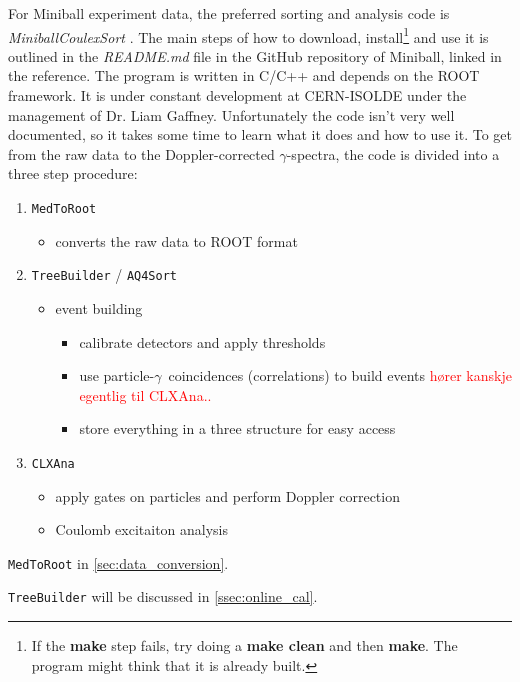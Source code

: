 \documentclass[twoside,english]{uiofysmaster/uiofysmaster}
\newcommand{\ga}{$\gamma$}
\let\orgautoref\autoref
\renewcommand{\autoref}
        {%
		 \def\sectionautorefname{Section}%
		 \def\subsectionautorefname{Section}%
		 \def\subsubsectionautorefname{Section}%
		 \def\chapterautorefname{Chapter}%
          \orgautoref}
\begin{document}
For Miniball experiment data, the preferred sorting and analysis code is \textsl{MiniballCoulexSort} \cite{MBCS}. 
The main steps of how to download, install\footnote{If the \textbf{make} step fails, try doing a \textbf{make clean} and then \textbf{make}. The program might think that it is already built.} and use it is outlined in the \textit{README.md} file in the GitHub repository of Miniball, linked in the reference. 
The program is written in C/C++ and depends on the ROOT framework. 
It is under constant development at CERN-ISOLDE under the management of Dr. Liam Gaffney. 
Unfortunately the code isn't very well documented, so it takes some time to learn what it does and how to use it. 
To get from the raw data to the Doppler-corrected \ga-spectra, the code is divided into a three step procedure:

\begin{enumerate}
	\item \texttt{MedToRoot}
	\begin{itemize}
		\item converts the raw data to ROOT format
	\end{itemize}
	\item \texttt{TreeBuilder} / \texttt{AQ4Sort}
	\begin{itemize}
		\item event building
		\begin{itemize}
			\item calibrate detectors and apply thresholds
			\item use particle-\ga\ coincidences (correlations) to build events \textcolor{red}{hører kanskje egentlig til CLXAna..}
			\item store everything in a three structure for easy access
		\end{itemize}
	\end{itemize}
	\item \texttt{CLXAna}
	\begin{itemize}
		\item apply gates on particles and perform Doppler correction
		\item Coulomb excitaiton analysis
	\end{itemize}
\end{enumerate}

\bigskip

\texttt{MedToRoot} in \autoref{sec:data_conversion}.

\texttt{TreeBuilder} will be discussed in \autoref{ssec:online_cal}.
\end{document}

